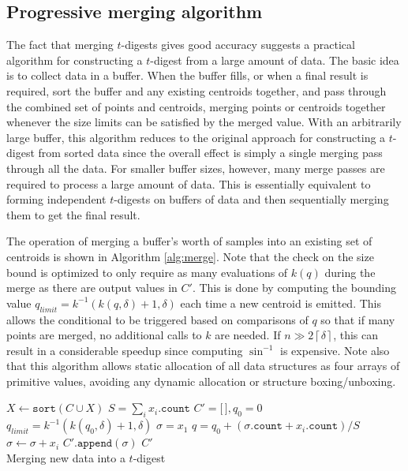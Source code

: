 \documentclass[11pt]{amsart}
\begin{document}
\subsection{Progressive merging algorithm}
The fact that merging $t$-digests gives good accuracy suggests a practical algorithm for constructing a $t$-digest from a large amount of data. The basic idea is to collect data in a buffer. When the buffer fills, or when a final result is required, sort the buffer and any existing centroids together, and pass through the combined set of points and centroids, merging points or centroids together whenever the size limits can be satisfied by the merged value. With an arbitrarily large buffer, this algorithm reduces to the original approach for constructing a $t$-digest from sorted data since the overall effect is simply a single merging pass through all the data. For smaller buffer sizes, however, many merge passes are required to process a large amount of data. This is essentially equivalent to forming independent $t$-digests on buffers of data and then sequentially merging them to get the final result.

The operation of merging a buffer's worth of samples into an existing set of centroids is shown in Algorithm \ref{alg:merge}. Note that the check on the size bound is optimized to only require as many evaluations of $k(q)$ during the merge as there are output values in $C'$. This is done by computing the bounding value $q_{limit} = k^{-1}(k(q, \delta) + 1, \delta)$ each time a new centroid is emitted. This allows the conditional to be triggered based on comparisons of $q$ so that if many points are merged, no additional calls to $k$ are needed. If $n \gg 2 \left \lceil \delta \right \rceil$, this can result in a considerable speedup since computing $\sin^{-1}$ is expensive. Note also that this algorithm allows static allocation of all data structures as four arrays of primitive values, avoiding any dynamic allocation or structure boxing/unboxing.
\begin{algorithm}[ht]
 \label{alg:merge}
\SetNoFillComment
{}
$X \gets \mathtt{sort}(C \cup X)$\;
$ S = \sum_i x_i.\mathtt{count}$\;
$C' = \lbrack \, \rbrack, q_0 = 0$\;
$q_{limit}=k^{-1}(k(q_0, \delta)+1, \delta)$\;
$\sigma = x_1$\;
 {
  $q = q_0 + (\sigma.\mathtt{count} + x_i.\mathtt{count})/S$\;
   {
      $\sigma \gets \sigma + x_i$\;
  } 
} 
$C'\mathtt{.append}(\sigma)$\;
\Return $ C' $\\
\caption{Merging new data into a $t$-digest}
\end{algorithm}
\end{document}
